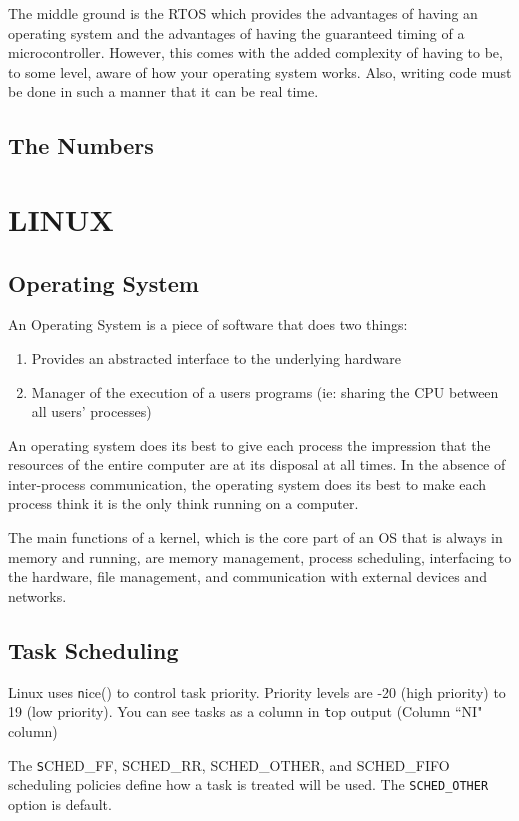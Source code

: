 \documentclass{article}
\begin{document}
The middle ground is the RTOS which provides the advantages of having an operating system and the advantages of having the guaranteed timing of a microcontroller.  However, this comes with the added complexity of having to be, to some level, aware of how your operating system works.  Also, writing code must be done in such a manner that it can be real time.

\subsection{The Numbers}

\section{LINUX}
\subsection{Operating System}
An Operating System is a piece of software that does two things:
\begin{enumerate}
\item Provides an abstracted interface to the underlying hardware
\item Manager of the execution of a users programs (ie: sharing the CPU between all users' processes)
\end{enumerate}
An operating system does its best to give each process the impression that the resources of the entire computer are at its disposal at all times.  In the absence of inter-process communication, the operating system does its best to make each process think it is the only think running on a computer.

The main functions of a kernel, which is the core part of an OS that is always in memory and running, are memory management, process scheduling, interfacing to the hardware, file management, and communication with external devices and networks. \cite{IntroLinuxForRealTime}
\subsection{Task Scheduling}
Linux uses {\texttt nice()} to control task priority.  Priority levels are -20 (high priority) to 19 (low priority).  You can see tasks as a column in {\texttt top} output (Column ``NI" column)

The {\texttt SCHED\_FF, SCHED\_RR, SCHED\_OTHER, and SCHED\_FIFO} scheduling policies define how a task is treated will be used.  The \texttt{SCHED\_OTHER} option is default.
\end{document}
